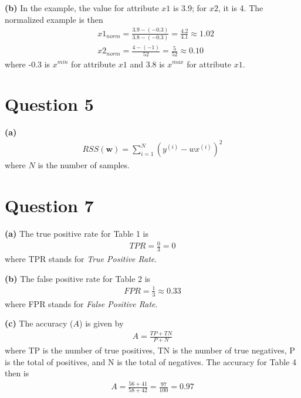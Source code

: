 \documentclass[leqno]{article}
\begin{document}
\hfill

\textbf{(b)} In the example, the value for attribute $x1$ is 3.9; for $x2$, it is 4. The normalized example is then
\begin{equation*}
\begin{split}
&x1_{norm} = \frac{3.9 - (-0.3)}{3.8 - (-0.3)} = \frac{4.2}{4.1} \approx 1.02\\
&x2_{norm} = \frac{4 - (-1)}{52} = \frac{5}{52} \approx 0.10
\end{split}
\end{equation*} 
where -0.3 is $x^{min}$ for attribute $x1$ and 3.8 is $x^{max}$ for attribute $x1$.

\hfill

\section*{Question 5} \textbf{(a)} 
\begin{equation*}
\begin{split}
RSS(\textbf{w}) = \sum_{i=1}^{N}(y^{(i)} - wx^{(i)})^2
\end{split}
\end{equation*} 
where $N$ is the number of samples.



\section*{Question 7} \textbf{(a)} The true positive rate for Table 1 is
\begin{equation*}
\begin{split}
TPR = \frac{0}{3} = 0
\end{split}
\end{equation*} 
where TPR stands for \textit{True Positive Rate}.

\hfill

\textbf{(b)} The false positive rate for Table 2 is
\begin{equation*}
\begin{split}
FPR = \frac{1}{3} \approx 0.33
\end{split}
\end{equation*} 
where FPR stands for \textit{False Positive Rate}.

\hfill

\textbf{(c)} The accuracy ($A$) is given by
\begin{equation*}
\begin{split}
A = \frac{TP + TN}{P + N}
\end{split}
\end{equation*} 
where TP is the number of true positives, TN is the number of true negatives, P is the total of positives, and N is 
the total of negatives. The accuracy for Table 4 then is
\begin{equation*}
\begin{split}
A = \frac{56 + 41}{58 + 42} = \frac{97}{100} = 0.97 
\end{split}
\end{equation*} 
\end{document}

